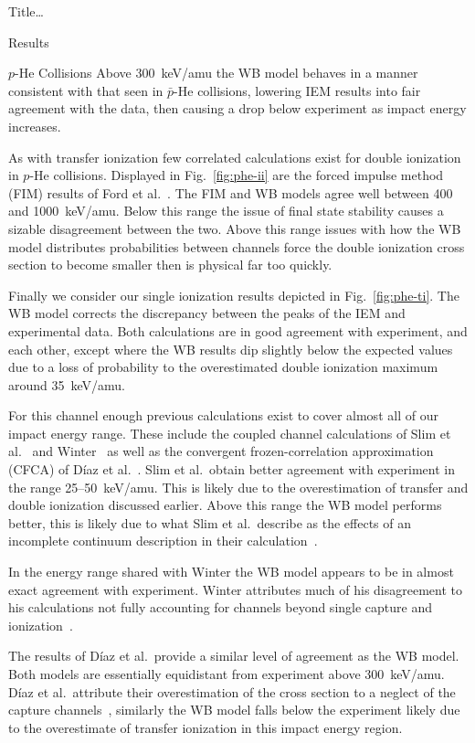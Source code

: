 \documentclass[letterpaper, 11 pt]{report}
\begin{document}
\begin{chapter}{ Title\dots \label{chap:p-he2p-he}}
\begin{section}{Results \label{sec:phe2p-res}}
\begin{subsection}{\texorpdfstring{$p$}{p}-He Collisions \label{sec:phe-res}}
         Above 300~keV/amu the WB model behaves in a manner consistent with that seen in $\bar{p}$-He
         collisions, lowering IEM results into fair agreement with the data, then causing a drop below
         experiment as impact energy increases.
         
         As with transfer ionization few correlated calculations exist for double ionization in $p$-He
         collisions. Displayed in Fig.~\ref{fig:phe-ii} are the forced impulse method (FIM) results of
         Ford et al.~\cite{FR-94}. The FIM and WB models agree well between 400 and
         1000~keV/amu. Below this range the issue of final state stability causes a sizable disagreement
         between the two. Above this range issues with how the WB model distributes probabilities
         between channels force  the double ionization cross section to become smaller then is physical
         far too quickly.

         Finally we consider our single ionization results depicted in Fig.~\ref{fig:phe-ti}. The WB
         model corrects the discrepancy between the peaks of the IEM and experimental data. Both
         calculations are in good agreement with experiment, and each other, except where the WB results
         dip slightly below the expected values due to a loss of probability to the overestimated double
         ionization maximum around 35~keV/amu.

         For this channel enough previous calculations exist to cover almost all of our impact energy
         range. These include the coupled channel calculations of Slim et al.~\cite{SHBF-91}
         and Winter~\cite{Winter-91} as well as the convergent frozen-correlation approximation (CFCA)
         of D\'{i}az et al.~\cite{DMS-00}. Slim et al.\ obtain better agreement with
         experiment in the range 25--50~keV/amu. This is likely due to the overestimation of transfer and
         double ionization discussed earlier. Above this range the WB model performs better, this is
         likely due to what Slim et al.\ describe as the effects of an incomplete continuum
         description in their calculation~\cite{SHBF-91}.
         
         In the energy range shared with Winter the WB model appears to be in almost exact agreement
         with experiment. Winter attributes much of his disagreement to his calculations not fully
         accounting for channels beyond single capture and ionization~\cite{Winter-91}.

         The results of D\'{i}az et al.\ provide a similar level of agreement as the WB model.
         Both models are essentially equidistant from experiment above 300~keV/amu. D\'{i}az
         et al.\ attribute their overestimation of the cross section to a neglect of the
         capture channels~\cite{DMS-00}, similarly the WB model falls below the experiment likely due to
         the overestimate of transfer ionization in this impact energy region.


\end{subsection}
\end{section}
\end{chapter}
\end{document}
